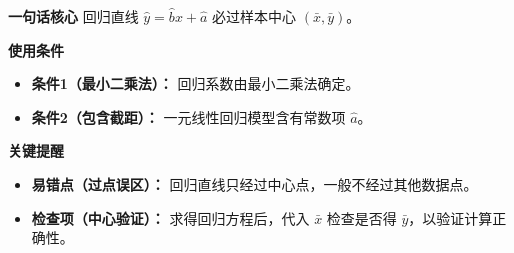 \begin{summarybox}
	\textbf{\textcolor{CSummary}{一句话核心}}
	回归直线 $\hat{y} = \hat{b}x + \hat{a}$ 必过样本中心 $(\bar{x},\bar{y})$。

	\medskip
	\textbf{\textcolor{CSummary}{使用条件}}
	\begin{itemize}[leftmargin=*, itemsep=0.5em, topsep=0.4em]
		\item \textbf{条件1（最小二乘法）：} 回归系数由最小二乘法确定。
		\item \textbf{条件2（包含截距）：} 一元线性回归模型含有常数项 $\hat{a}$。
	\end{itemize}

	\medskip
	\textbf{\textcolor{CSummary}{关键提醒}}
	\begin{itemize}[leftmargin=*, itemsep=0.5em, topsep=0.4em]
		\item \textbf{易错点（过点误区）：} 回归直线只经过中心点，一般不经过其他数据点。
		\item \textbf{检查项（中心验证）：} 求得回归方程后，代入 $\bar{x}$ 检查是否得 $\bar{y}$，以验证计算正确性。
	\end{itemize}

\end{summarybox}
